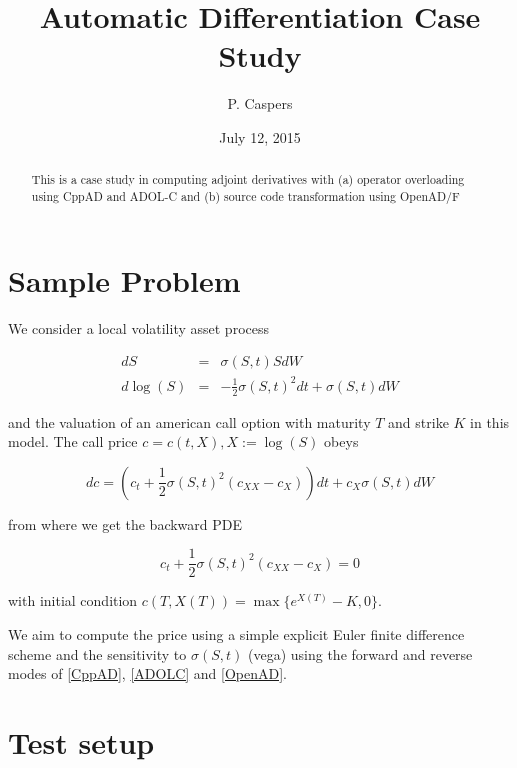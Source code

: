 \documentclass{amsart}
\theoremstyle{plain}
\numberwithin{equation}{section}
\begin{document}
\title[AD]{Automatic Differentiation Case Study}
\author{P. Caspers}
\date{July 12, 2015}
\begin{abstract}
This is a case study in computing adjoint derivatives with (a) operator overloading using CppAD \cite{CppAD} and ADOL-C \cite{ADOLC} and (b) source code transformation using OpenAD/F \cite{OpenAD}
\end{abstract}

\maketitle

\tableofcontents

\section{Sample Problem}

We consider a local volatility asset process 

\begin{eqnarray}
dS &=& \sigma(S,t) S dW \\
d\log(S) &=& -\frac{1}{2}\sigma(S,t)^2 dt + \sigma(S,t) dW
\end{eqnarray}

and the valuation of an american call option with maturity $T$ and strike $K$ in this model. The call price $c = c(t,X), X:=\log(S)$ obeys

\begin{equation}
dc = \left(c_t + \frac{1}{2} \sigma(S,t)^2 (c_{XX}-c_{X}) \right) dt + c_X \sigma(S,t) dW 
\end{equation}

from where we get the backward PDE

\begin{equation}
c_t + \frac{1}{2}\sigma(S,t)^2(c_{XX}-c_X) = 0
\end{equation}

with initial condition $c(T,X(T)) = \max\{ e^{X(T)}  - K, 0 \}$.

We aim to compute the price using a simple explicit Euler finite difference scheme and the sensitivity to $\sigma(S,t)$ (vega) using the forward and reverse modes of \ref{CppAD}, \ref{ADOLC} and \ref{OpenAD}. 


\section{Test setup}
\end{document}
